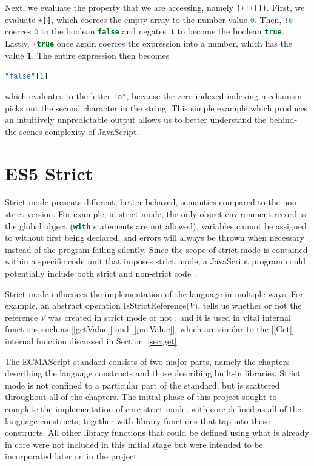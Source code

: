 \documentclass[a4paper,11pt,twoside]{report}
\def\jsinline{\lstinline[language=JavaScript, basicstyle=\small]}%\end{lstlisting}
\begin{document}
Next, we evaluate the property that we are accessing, namely \jsinline|(+!+[])|. First, we evaluate \jsinline|+[]|, which coerces the empty array to the number value \jsinline|0|. Then, \jsinline|!0| coerces \jsinline|0| to the boolean \jsinline|false| and negates it to become the boolean \jsinline{true}. Lastly, \jsinline|+true| once again coerces the expression into a number, which has the value \textbf{1}. The entire expression then becomes
\begin{center}
\jsinline|"false"[1]|
\end{center}
\noindent which evaluates to the letter \jsinline|"a"|, because the zero-indexed indexing mechanism picks out the second character in the string. This simple example which produces an intuitively unpredictable output allows us to better understand the behind-the-scenes complexity of JavaScript.

\section{ES5 Strict}\label{sec:strict}
Strict mode presents different, better-behaved, semantics compared to the non-strict version. For example, in strict mode, the only object environment record is the global object (\jsinline|with| statements are not allowed), variables cannot be assigned to without first being declared, and errors will always be thrown when necessary instead of the program failing silently. Since the scope of strict mode is contained within a specific code unit that imposes strict mode, a JavaScript program could potentially include both strict and non-strict code \cite{EcmaScript}.

Strict mode influences the implementation of the language in multiple ways. For example, an abstract operation IsStrictReference($V$), tells us whether or not the reference $V$ was created in strict mode or not \cite{EcmaScript}, and it is used in vital internal functions such as [[getValue]] and [[putValue]], which are similar to the [[Get]] internal function discussed in Section~\ref{sec:get}.

The ECMAScript standard consists of two major parts, namely the chapters describing the language constructs and those describing built-in libraries. Strict mode is not confined to a particular part of the standard, but is scattered throughout all of the chapters. The initial phase of this project sought to complete the implementation of core strict mode, with core defined as all of the language constructs, together with library functions that tap into these constructs. All other library functions that could be defined using what is already in core were not included in this initial stage but were intended to be incorporated later on in the project.
\end{document}
